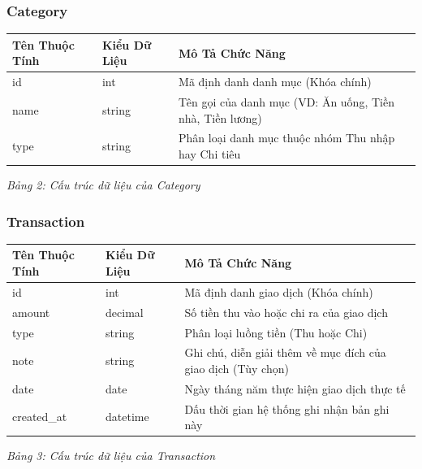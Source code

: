 \documentclass[12pt,letterpaper]{article}
\begin{document}
\subsubsection{Category}

\begin{center}
    \begin{tabular}{|l|l|p{8.5cm}|}
        \hline
        \textbf{Tên Thuộc Tính} & \textbf{Kiểu Dữ Liệu} & \textbf{Mô Tả Chức Năng} \\ \hline
        id & int & Mã định danh danh mục (Khóa chính) \\ \hline
        name & string & Tên gọi của danh mục (VD: Ăn uống, Tiền nhà, Tiền lương) \\ \hline
        type & string & Phân loại danh mục thuộc nhóm Thu nhập hay Chi tiêu\\ \hline
    \end{tabular}
    
    \vspace{0.2cm}
    \textit{Bảng 2: Cấu trúc dữ liệu của Category}
\end{center}

\subsubsection{Transaction}

\begin{center}
    \begin{tabular}{|l|l|p{8.5cm}|}
        \hline
        \textbf{Tên Thuộc Tính} & \textbf{Kiểu Dữ Liệu} & \textbf{Mô Tả Chức Năng} \\ \hline
        id & int & Mã định danh giao dịch (Khóa chính) \\ \hline
        amount & decimal & Số tiền thu vào hoặc chi ra của giao dịch \\ \hline
        type & string & Phân loại luồng tiền (Thu hoặc Chi) \\ \hline
        note & string & Ghi chú, diễn giải thêm về mục đích của giao dịch (Tùy chọn) \\ \hline
        date & date & Ngày tháng năm thực hiện giao dịch thực tế \\ \hline
        created\_at & datetime & Dấu thời gian hệ thống ghi nhận bản ghi này \\ \hline
    \end{tabular}
    
    \vspace{0.2cm}
    \textit{Bảng 3: Cấu trúc dữ liệu của Transaction}
\end{center}
\end{document}

